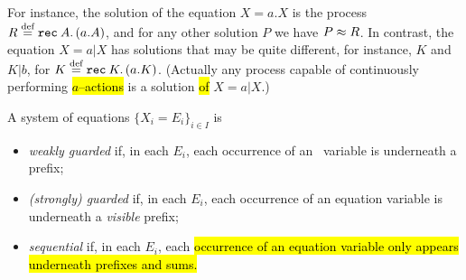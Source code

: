 


For instance, the solution of the equation 
$ X = a. X$ 
is  the process
$R \stackrel{\mbox{\scriptsize def}}{=} {\tt rec}\: A . \, (a. A)$, and for any other solution $P$ we have $P \approx R$.
In contrast, the equation 
 $X = a|  X$ has solutions that may be quite different, for instance,
 $K$ and $K | b$, for $K \stackrel{\mbox{\scriptsize def}}{=} {\tt rec}\: K . \, (a. K)$. (Actually any process capable of
continuously performing \hl{$a$--actions} is a solution \hl{of} $X = a  |  X$.)




\begin{definition}
\label{def:guardness}
A system of equations 
$\{  X_i = E_i\}_{i\in I}$
 is 
\begin{itemize}
\item \emph{weakly guarded} if, in each $E_i$, each occurrence of
  an \behav\  variable is underneath a prefix;

\item \emph{(strongly) guarded} if, in each $E_i$, each occurrence of
  an equation variable is underneath a \emph{visible} prefix;

\item \emph{sequential} if, in each $E_i$, each \hl{occurrence of an
    equation variable only appears underneath prefixes and sums.}
\end{itemize}
\end{definition}


